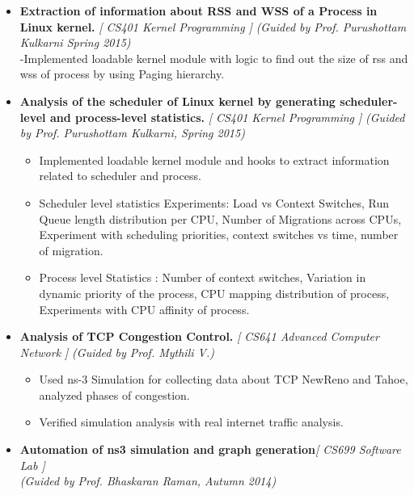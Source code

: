 \begin{itemize}
	\item \textbf{Extraction of information about RSS and WSS of a Process in Linux kernel.} \hfill \emph{[ CS401 Kernel Programming ]}\hfill 
	\emph{(Guided by Prof. Purushottam Kulkarni Spring 2015)} \\
	-Implemented loadable kernel module with logic to find out the size of rss and wss of process by using Paging hierarchy. \\[-0.6cm]
	\item \textbf{Analysis of the scheduler of Linux kernel by generating scheduler-level and process-level statistics.} \hfill \emph{[ CS401 Kernel Programming ]} \hfill
	\emph{(Guided by Prof. Purushottam Kulkarni, Spring 2015)}\hfill \\[-0.7cm]
	\begin{itemize}
	 \item Implemented loadable kernel module and hooks to extract information related to scheduler and process.\\[-0.6cm]
	 \item Scheduler level statistics Experiments: Load vs Context Switches, Run Queue length distribution per CPU, Number of Migrations across CPUs, Experiment with scheduling priorities, context switches vs time, number of migration.\\[-0.6cm]
	 \item Process level Statistics : Number of context switches, Variation in dynamic priority of the process, CPU mapping distribution of process, Experiments with CPU affinity of process.\\[-0.6cm]
	\end{itemize}
	\item \textbf{Analysis of TCP Congestion Control.} \hfill \emph{[ CS641 Advanced Computer Network ]} \emph{(Guided by Prof. Mythili V.)} \\[-0.6cm]
\begin{itemize}
	\item Used ns-3 Simulation for collecting data about TCP NewReno and Tahoe, analyzed phases of congestion. 
	\item Verified simulation analysis with real internet traffic analysis.
\end{itemize}
	\item \textbf{Automation of ns3 simulation and graph generation}\hfill\emph{[ CS699 Software Lab ]}  \\
	\emph{(Guided by Prof. Bhaskaran Raman, Autumn 2014)}  \\[-0.6cm]
	\begin{itemize}

\end{itemize}
\end{itemize}
